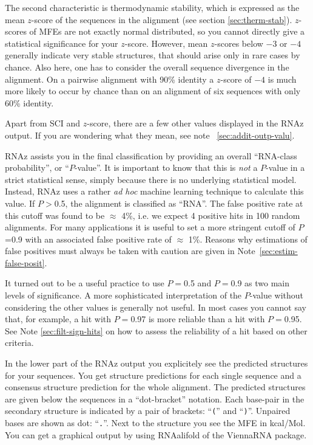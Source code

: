 \documentclass[11pt]{article}
\begin{document}
The second characteristic is thermodynamic stability, which is expressed as
the mean $z$-score of the sequences in the alignment (see section
\ref{sec:therm-stab}). $z$-scores of MFEs are not exactly normal
distributed, so you cannot directly give a statistical significance for
your $z$-score. However, mean $z$-scores below $-3$ or $-4$ generally
indicate very stable structures, that should arise only in rare cases by
chance. Also here, one has to consider the overall sequence divergence in
the alignment. On a pairwise alignment with 90\% identity a $z$-score of
$-4$ is much more likely to occur by chance than on an alignment of six
sequences with only 60\% identity.

Apart from SCI and $z$-score, there are a few other values displayed in the
RNAz output. If you are wondering what they mean, see note
~\ref{sec:addit-outp-valu}.

RNAz assists you in the final classification by providing an overall
``RNA-class probability'', or ``$P$-value''. It is important to know that
this is \emph{not} a $P$-value in a strict statistical sense, simply
because there is no underlying statistical model. Instead, RNAz uses a
rather \emph{ad hoc} machine learning technique to calculate this value.
If $P>$0.5, the alignment is classified as ``RNA''.  The false positive
rate at this cutoff was found to be $\approx$ 4\%, i.e. we expect 4
positive hits in 100 random alignments. For many applications it is useful
to set a more stringent cutoff of $P$=0.9 with an associated false positive
rate of $\approx$ 1\%. Reasons why estimations of false positives must
always be taken with caution are given in Note~\ref{sec:estim-false-posit}.

It turned out to be a useful practice to use $P=$0.5 and $P=$0.9 as two
main levels of significance. A more sophisticated interpretation of the
$P$-value without considering the other values is generally not useful. In
most cases you cannot say that, for example, a hit with $P=$0.97 is more
reliable than a hit with $P=$0.95. See Note \ref{sec:filt-sign-hits} on how
to assess the reliability of a hit based on other criteria.

In the lower part of the RNAz output you explicitely see the predicted
structures for your sequences. You get structure predictions for each
single sequence and a consensus structure prediction for the whole
alignment. The predicted structures are given below the sequences in a
``dot-bracket'' notation. Each base-pair in the secondary structure is
indicated by a pair of brackets: ``\texttt{(}'' and ``\texttt{)}''.
Unpaired bases are shown as dot: ``\texttt{.}''. Next to the structure you
see the MFE in kcal/Mol. You can get a graphical output by using RNAalifold
of the ViennaRNA package.
\end{document}
